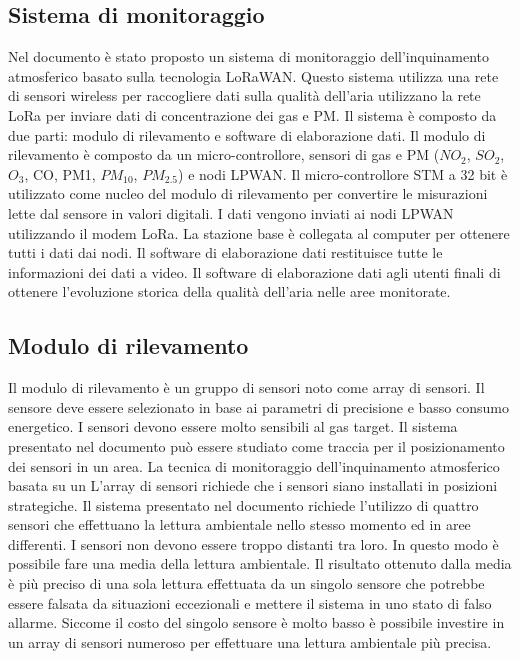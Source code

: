 \documentclass[a4paper]{report} %
\begin{document}
\subsection{Sistema di monitoraggio}

Nel documento \cite{art:rif.40} è stato proposto un sistema di monitoraggio dell'inquinamento atmosferico basato sulla tecnologia LoRaWAN. 
Questo sistema utilizza una rete di sensori wireless per raccogliere dati sulla qualità dell'aria utilizzano la rete LoRa per inviare dati di concentrazione dei gas e PM. 
Il sistema è composto da due parti: modulo di rilevamento e software di elaborazione dati. 
Il modulo di rilevamento è composto da un micro-controllore, sensori di gas e PM ($ NO_{2} $, $ SO_{2} $, $ O_{3} $, CO, PM1, $ PM_{10} $, $ PM_{2.5} $) e nodi LPWAN. 
Il micro-controllore STM a 32 bit è utilizzato come nucleo del modulo di rilevamento per convertire le misurazioni lette dal sensore in valori digitali. 
I dati vengono inviati ai nodi LPWAN utilizzando il modem LoRa. 
La stazione base è collegata al computer per ottenere tutti i dati dai nodi. 
Il software di elaborazione dati restituisce tutte le informazioni dei dati a video. Il software di elaborazione dati agli utenti finali di ottenere l'evoluzione storica della qualità dell'aria nelle aree monitorate.

\subsection{Modulo di rilevamento}
Il modulo di rilevamento è un gruppo di sensori noto come array di sensori. 
Il sensore deve essere selezionato in base ai parametri di precisione e basso consumo energetico. I sensori devono essere molto sensibili al gas target. 
Il sistema presentato nel documento \cite{art:rif.40} può essere studiato come traccia per il posizionamento dei sensori in un area.
La tecnica di monitoraggio dell'inquinamento atmosferico basata su un
L'array di sensori richiede che i sensori siano installati in posizioni strategiche.
Il sistema presentato nel documento \cite{art:rif.40} richiede l'utilizzo di quattro sensori che effettuano la lettura ambientale nello stesso momento ed in aree differenti.
I sensori non devono essere troppo distanti tra loro. In questo modo è possibile fare una media della lettura ambientale. 
Il risultato ottenuto dalla media è più preciso di una sola lettura effettuata da un singolo sensore che potrebbe essere falsata da situazioni eccezionali e mettere il sistema in uno stato di falso allarme. 
Siccome il costo del singolo sensore è molto basso è possibile investire in un array di sensori numeroso per effettuare una lettura ambientale più precisa. 
\end{document}
